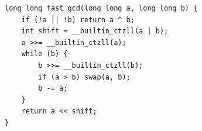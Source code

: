 
\begin{lstlisting}
long long fast_gcd(long long a, long long b) {
    if (!a || !b) return a ^ b;
    int shift = __builtin_ctzll(a | b);
    a >>= __builtin_ctzll(a);
    while (b) {
        b >>= __builtin_ctzll(b);
        if (a > b) swap(a, b);
        b -= a;
    }
    return a << shift;
}
\end{lstlisting}
